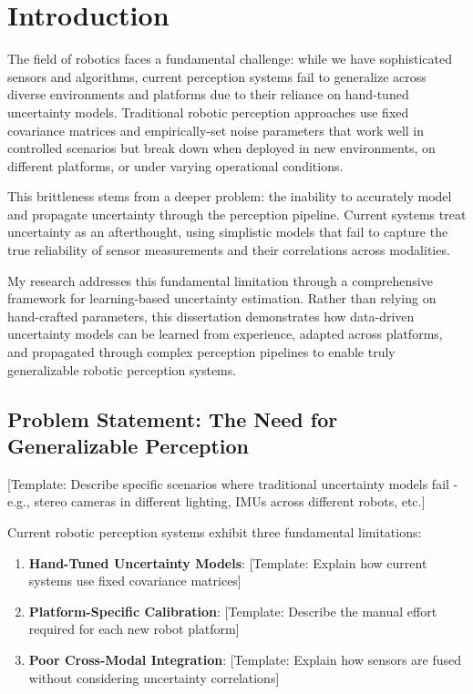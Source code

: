 \chapter{Introduction} \label{chapter:introduction}

The field of robotics faces a fundamental challenge: while we have sophisticated sensors and algorithms, current perception systems fail to generalize across diverse environments and platforms due to their reliance on hand-tuned uncertainty models. 
Traditional robotic perception approaches use fixed covariance matrices and empirically-set noise parameters that work well in controlled scenarios but break down when deployed in new environments, on different platforms, or under varying operational conditions.

This brittleness stems from a deeper problem: the inability to accurately model and propagate uncertainty through the perception pipeline. Current systems treat uncertainty as an afterthought, using simplistic models that fail to capture the true reliability of sensor measurements and their correlations across modalities.

My research addresses this fundamental limitation through a comprehensive framework for learning-based uncertainty estimation. Rather than relying on hand-crafted parameters, this dissertation demonstrates how data-driven uncertainty models can be learned from experience, adapted across platforms, and propagated through complex perception pipelines to enable truly generalizable robotic perception systems.

\section{Problem Statement: The Need for Generalizable Perception}
\label{sec:problem_statement}

[Template: Describe specific scenarios where traditional uncertainty models fail - e.g., stereo cameras in different lighting, IMUs across different robots, etc.]

Current robotic perception systems exhibit three fundamental limitations:

\begin{enumerate}
    \item \textbf{Hand-Tuned Uncertainty Models}: [Template: Explain how current systems use fixed covariance matrices]
    \item \textbf{Platform-Specific Calibration}: [Template: Describe the manual effort required for each new robot platform]
    \item \textbf{Poor Cross-Modal Integration}: [Template: Explain how sensors are fused without considering uncertainty correlations]
\end{enumerate}

